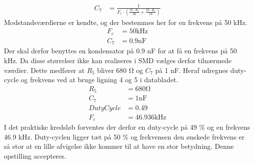\begin{align}
	C_7 & = \frac{1}{F_c \cdot \left( \frac{25 \cdot R_5 }{36} + \frac{25 \cdot R_6}{18} \right) }
	\end{align}
Modstandsværdierne er kendte, og der bestemmes her for en frekvens på 50 \si{\kilo\hertz}.
\begin{align}
F_c & = 50 \si{\kilo \hertz} \\
C_7 & = 0.9 \si{\nano\farad} \nonumber
\end{align}
Der skal derfor benyttes en kondensator på 0.9 \si{\nano\farad} for at få en frekvens på 50 \si{\kilo\hertz}. 
Da disse størrelser ikke kan realiseres i SMD vælges derfor tilnærmede værdier. 
Dette medfører at $R_5$ bliver 680 \si{\ohm} og $C_7$ på 1 \si{\nano\farad}. 
Heraf udregnes duty-cycle og frekvens ved at bruge ligning 4 og 5 i databladet.
\begin{align}
R_5 & = 680 \si{\ohm} \nonumber \\
C_7 & = 1 \si{\nano\farad} \nonumber \\
DutyCycle & = 0.49 \nonumber \\
F_c & = 46.936 \si {\kilo\hertz} \nonumber
\end{align}
I det praktiske kredsløb forventes der derfor en duty-cycle på 49 \% og en frekvens 46.9 \si{\kilo\hertz}. 
Duty-cyclen ligger tæt på 50 \% og frekvensen den ønskede frekvens er så stor at en lille afvigelse ikke kommer til at have en stor betydning. Denne opstilling accepteres.


